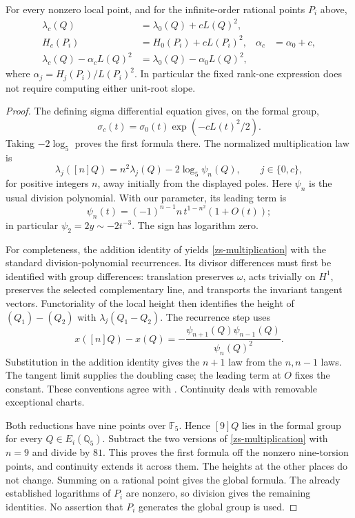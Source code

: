 \begin{proposition}
\label{zs-splitting}
For every nonzero local point, and for the infinite-order rational
points \(P_i\) above,
\begin{align}
 \lambda_c(Q)&=\lambda_0(Q)+cL(Q)^2,\\
 H_c(P_i)&=H_0(P_i)+cL(P_i)^2,&
 \alpha_c&=\alpha_0+c,\\
 \lambda_c(Q)-\alpha_cL(Q)^2
   &=\lambda_0(Q)-\alpha_0L(Q)^2,
 \label{zs-cancellation}
\end{align}
where \(\alpha_j=H_j(P_i)/L(P_i)^2\). In particular the fixed
rank-one expression does not require computing either unit-root slope.
\end{proposition}
\begin{proof}
The defining sigma differential equation gives, on the formal group,
\[
 \sigma_c(t)=\sigma_0(t)\exp(-cL(t)^2/2).
\]
Taking \(-2\log_5\) proves the first formula there. The normalized
multiplication law is
\begin{equation}
 \lambda_j([n]Q)=n^2\lambda_j(Q)-2\log_5\psi_n(Q),
 \qquad j\in\{0,c\},
 \label{zs-multiplication}
\end{equation}
for positive integers \(n\), away initially from the displayed poles.
Here \(\psi_n\) is the usual division polynomial. With our parameter,
its leading term is
\[
 \psi_n(t)=(-1)^{n-1}n\,t^{1-n^2}(1+O(t));
\]
in particular \(\psi_2=2y\sim-2t^{-3}\). The sign has logarithm zero.

For completeness, the addition identity of
\cite[Lemma~7.4]{BalakrishnanDograQCI} yields
\eqref{zs-multiplication} with the standard division-polynomial
recurrences. Its divisor differences must first be identified with
group differences: translation preserves \(\omega\), acts trivially
on \(H^1\), preserves the selected complementary line, and transports
the invariant tangent vectors. Functoriality of the local height then
identifies the height of \((Q_1)-(Q_2)\) with
\(\lambda_j(Q_1-Q_2)\). The recurrence step uses
\[
 x([n]Q)-x(Q)=-\frac{\psi_{n+1}(Q)\psi_{n-1}(Q)}{\psi_n(Q)^2}.
\]
Substitution in the addition identity gives the \(n+1\) law from
the \(n,n-1\) laws. The tangent limit supplies the doubling case;
the leading term at \(O\) fixes the constant. These conventions agree
with \cite[\S5.5 and Theorem~5.21]{SutherlandDivisionPolynomials2023}.
Continuity deals with removable exceptional charts.

Both reductions have nine points over \(\mathbb F_5\). Hence \([9]Q\)
lies in the formal group for every \(Q\in E_i(\mathbb Q_5)\).
Subtract the two versions of \eqref{zs-multiplication} with \(n=9\)
and divide by \(81\). This proves the first formula off the nonzero
nine-torsion points, and continuity extends it across them. The
heights at the other places do not change. Summing on a rational
point gives the global formula. The already established logarithms
of \(P_i\) are nonzero, so division gives the remaining identities.
No assertion that \(P_i\) generates the global group is used.
\end{proof}

